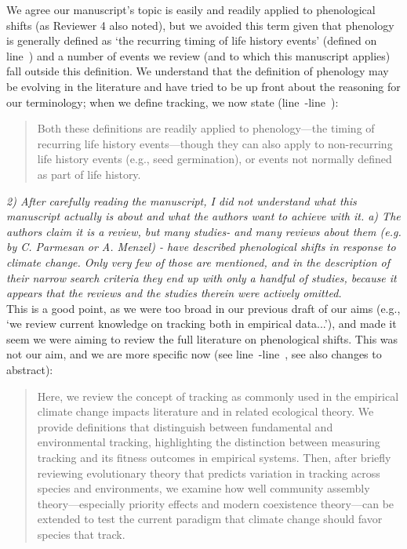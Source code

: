 \documentclass[11pt,letterpaper]{article}
\newcommand{\lr}[1]{line~\lineref{#1}}
\begin{document}
We agree our manuscript's topic is easily and readily applied to phenological shifts (as Reviewer 4 also noted), but we avoided this term given that phenology is generally defined as `the recurring timing of life history events' (defined on \lr{phendefine1}) and a number of events we review (and to which this manuscript applies) fall outside this definition. We understand that the definition of phenology may be evolving in the literature and have tried to be up front about the reasoning for our terminology; when we define tracking, we now state (\lr{phendefineS}-\lr{phendefineE}):  
\begin{quote}
Both these definitions are readily applied to phenology---the timing of recurring life history events---though they can also apply to non-recurring life history events (e.g., seed germination), or events not normally defined as part of life history.
\end{quote}


\emph{2) After carefully reading the manuscript, I did not understand what this manuscript actually
is about and what the authors want to achieve with it.
a) The authors claim it is a review, but many studies- and many reviews about them (e.g. by
C. Parmesan or A. Menzel) - have described phenological shifts in response to climate change.
Only very few of those are mentioned, and in the description of their narrow search criteria
they end up with only a handful of studies, because it appears that the reviews and the
studies therein were actively omitted.}\\

This is a good point, as we were too broad in our previous draft of our aims (e.g., `we review current knowledge on tracking both in empirical data...'), and made it seem we were aiming to review the full literature on phenological shifts. This was not our aim, and we are more specific now (see \lr{aimS}-\lr{aimE}, see also changes to abstract):
\begin{quote}
Here, we review the concept of tracking as commonly used in the empirical climate change impacts literature and in related ecological theory. We provide definitions that distinguish between fundamental and environmental tracking, highlighting the distinction between measuring tracking and its fitness outcomes in empirical systems. Then, after briefly reviewing evolutionary theory that predicts variation in tracking across species and environments, we examine how well community assembly theory---especially priority effects and modern coexistence theory---can be extended to test the current paradigm that climate change should favor species that track.
\end{quote}
\end{document}
